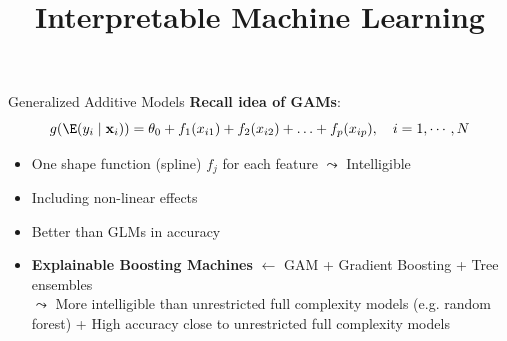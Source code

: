 \documentclass[11pt,compress,t,notes=noshow, aspectratio=169, xcolor=table]{beamer}
\title{Interpretable Machine Learning}
\date{}
\begin{document}
\newcommand{\titlefigure}{figure/ebm.jpg}
\newcommand{\learninggoals}{
\item Motivation from GAM
\item Intelligible GAM
\item Accurate GAM + Pairwise Interactions
\item FAST feature interaction detection
}


\begin{frame}{Generalized Additive Models}
\textbf{Recall idea of GAMs}: $$g(\E (y_i \mid \mathbf{x}_i)) = \theta_0 + f_1(x_{i1}) + f_2(x_{i2}) + \ldots + f_p(x_{ip}),\quad i=1,\cdots, N$$
\begin{itemize}
    \item One shape function (spline) $f_j$ for each feature $\leadsto$ Intelligible    
    \item Including non-linear effects
    \item Better than GLMs in accuracy
    \item \textbf{Explainable Boosting Machines} $\leftarrow$ GAM + Gradient Boosting + Tree ensembles \\$\leadsto$ More intelligible than unrestricted full complexity models (e.g. random forest) + High accuracy close to unrestricted full complexity models
\end{itemize}
\end{frame}
\end{document}
